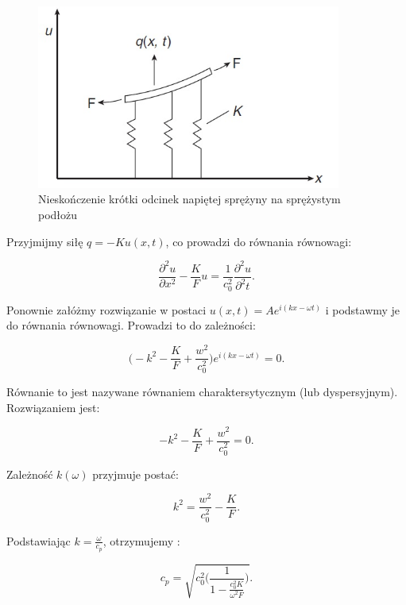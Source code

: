 \begin{figure}[h]
\centering
\includegraphics[width=10cm]{Zdjecia/2/dyspersja_analitycznie_sprezyna2}
\caption{Nieskończenie krótki odcinek napiętej sprężyny na sprężystym podłożu}
\label{fig:nieskonczenie_krotki_odcinek_sprezyny2}
\end{figure}

Przyjmijmy siłę \(q=-Ku(x,t)\), co prowadzi do równania równowagi:

\begin{equation}
\frac{\partial^2 u}{\partial x^2} - \frac{K}{F}u = \frac{1}{c_0^2} \frac{\partial^2 u}{\partial^2 t}.
\end{equation}

Ponownie załóżmy rozwiązanie w postaci \( u(x,t)=Ae^{i(kx-\omega t)} \) i podstawmy je do równania równowagi. Prowadzi to do zależności:

\begin{equation}
\Big(-k^2-\frac{K}{F}+\frac{w^2}{c_0^2}\Big)e^{i(kx-\omega t)}=0.
\end{equation}

Równanie to jest nazywane równaniem charaktersytycznym (lub dyspersyjnym). Rozwiązaniem jest:

\begin{equation}
-k^2-\frac{K}{F}+\frac{w^2}{c_0^2}=0.
\end{equation}

Zależność \(k(\omega)\) przyjmuje postać:

\begin{equation}
k^2=\frac{w^2}{c_0^2}-\frac{K}{F}.
\end{equation}

Podstawiając \( k=\frac{\omega}{c_p}\), otrzymujemy :

\begin{equation}
c_p = \sqrt{c_0^2\Bigg( \frac{1}{1 - \frac{c_0^2 K}{\omega^2 F} } \Bigg)}.
\end{equation}

